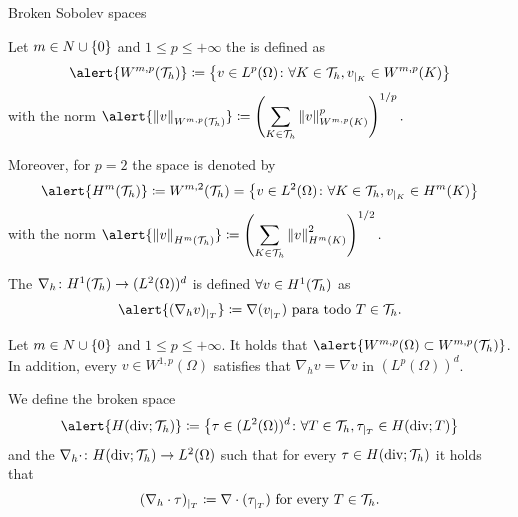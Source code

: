 \begin{frame}[allowframebreaks]{Broken Sobolev spaces}

{\small
\begin{definicion}
	Let $m\in\relax N\cup\{0\}$ and $1\leq p\leq+\infty$ the  is defined as
	$$\alert{W^{m,p}(\T_h)}\coloneqq\left\{v\in L^p(\Omega)\colon \forall K\in\T_h, v_{|_K}\in W^{m,p}(K)\right\}$$
	with the norm
	$\displaystyle\alert{\norma{v}_{W^{m,p}(\T_h)}}\coloneqq\left(\sum_{K\in\T_h} \norma{v}^p_{W^{m,p}(K)}\right)^{1/p}.$
	
	Moreover, for $p=2$ the space is denoted by
	$$\alert{H^m(\mathcal{T}_h)}\coloneqq W^{m,2}(\T_h)= \left\{v\in L^2(\Omega)\colon \forall K\in\T_h, v_{|_K}\in H^m(K) \right\}$$
	with the norm
	$\displaystyle\alert{\norma{v}_{H^m(\T_h)}}\coloneqq \left(\sum_{K\in\T_h}\norma{v}^2_{H^m(K)} \right)^{1/2}.$
\end{definicion}
}

\begin{definicion}
	The  $\nabla_h\colon H^1(\mathcal{T}_h)\to (L^2(\Omega))^d$ is defined $\forall v\in H^1(\mathcal{T}_h)$ as $$\alert{(\nabla_h v)_{|_T}}\coloneqq\nabla(v_{|_T})\text{ para todo } T\in\T_h.$$
\end{definicion}

\begin{lemma}
	\label{lemma:inclusion_sobolev}
	Let $m\in\relax N\cup\{0\}$ and $1\leq p\leq+\infty$. It holds that $\alert{W^{m,p}(\Omega)\subset W^{m,p}(\T_h)}$. In addition, every $v\in W^{1,p}(\Omega)$ satisfies that $\nabla_h v=\nabla v$ in $\left(L^p(\Omega)\right)^d$.
\end{lemma}

\begin{definicion}
	We define the broken space $$\alert{H(\text{div};\T_h)}\coloneqq\left\{\tau\in(L^2(\Omega))^d\colon \forall T\in\T_h, \tau_{|_T}\in H(\text{div};T)\right\}$$ and the  $\nabla_h\cdot\colon H(\text{div};\mathcal{T}_h)\to L^2(\Omega)$ such that for every $\tau\in H(\text{div};\mathcal{T}_h)$ it holds that $$(\nabla_h\cdot\tau)_{|_T}\coloneqq \nabla\cdot(\tau_{|_T})\text{ for every }T\in\mathcal{T}_h.$$
\end{definicion}

\end{frame}

